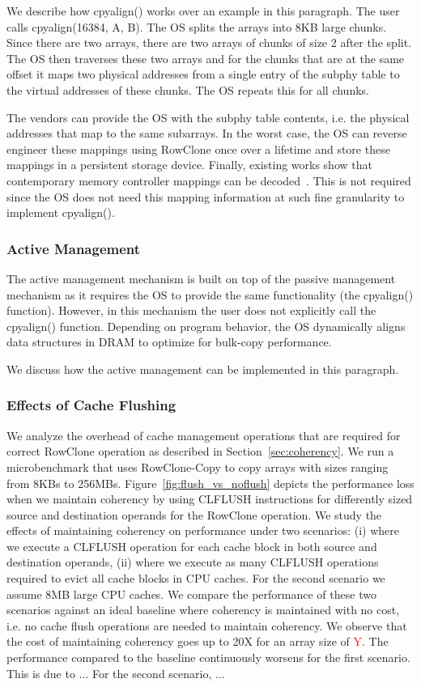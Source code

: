 We describe how cpyalign() works over an example in this paragraph. The user calls cpyalign(16384, A, B). The OS splits the arrays into 8KB large chunks. Since there are two arrays, there are two arrays of chunks of size 2 after the split. The OS then traverses these two arrays and for the chunks that are at the same offset it maps two physical addresses from a single entry of the subphy table to the virtual addresses of these chunks. The OS repeats this for all chunks.

The vendors can provide the OS with the subphy table contents, i.e. the physical addresses that map to the same subarrays. In the worst case, the OS can reverse engineer these mappings using RowClone once over a lifetime and store these mappings in a persistent storage device. Finally, existing works show that contemporary memory controller mappings can be decoded~\cite{X, Y}. This is not required since the OS does not need this mapping information at such fine granularity to implement cpyalign().

\subsubsection{Active Management}

The active management mechanism is built on top of the passive management mechanism as it requires the OS to provide the same functionality (the cpyalign() function). However, in this mechanism the user does not explicitly call the cpyalign() function. Depending on program behavior, the OS dynamically aligns data structures in DRAM to optimize for bulk-copy performance.

We discuss how the active management can be implemented in this paragraph.

\subsubsection{Effects of Cache Flushing}

We analyze the overhead of cache management operations that are required for correct RowClone operation as described in Section~\ref{sec:coherency}. We run a microbenchmark that uses RowClone-Copy to copy arrays with sizes ranging from 8KBs to 256MBs. Figure~\ref{fig:flush_vs_noflush} depicts the performance loss when we maintain coherency by using CLFLUSH instructions for differently sized source and destination operands for the RowClone operation. We study the effects of maintaining coherency on performance under two scenarios: (i) where we execute a CLFLUSH operation for each cache block in both source and destination operands, (ii) where we execute as many CLFLUSH operations required to evict all cache blocks in CPU caches. For the second scenario we assume 8MB large CPU caches. We compare the performance of these two scenarios against an ideal baseline where coherency is maintained with no cost, i.e. no cache flush operations are needed to maintain coherency. We observe that the cost of maintaining coherency goes up to 20X for an array size of \textcolor{red}{Y}. The performance compared to the baseline continuously worsens for the first scenario. This is due to ... For the second scenario, ... 

